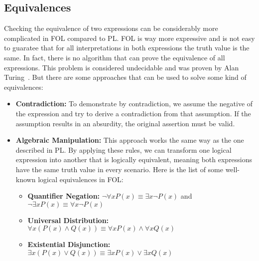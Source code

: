 \subsection{Equivalences}
Checking the equivalence of two expressions can be considerably more complicated in \gls{FOL} compared to \gls{PL}. \gls{FOL} is way more expressive and is not easy to guaratee that for all interpretations in both expressions the truth value is the same. In fact, there is no algorithm that can prove the equivalence of all expressions. This problem is considered undecidable and was proven by Alan Turing~\cite{turing_1936_on}. But there are some approaches that can be used to solve some kind of equivalences:

\begin{itemize}
    \item \textbf{Contradiction:} To demonstrate by contradiction, we assume the negative of the expression and try to derive a contradiction from that assumption. If the assumption results in an absurdity, the original assertion must be valid.
    \item \textbf{Algebraic Manipulation:} This approach works the same way as the one described in \gls{PL}. By applying these rules, we can transform one logical expression into another that is logically equivalent, meaning both expressions have the same truth value in every scenario. Here is the list of some well-known logical equivalences in \gls{FOL}:

    \begin{itemize}
        \item \textbf{Quantifier Negation:} \( \neg \forall x P(x) \equiv \exists x \neg P(x) \) and \( \neg \exists x P(x) \equiv \forall x \neg P(x) \)
        \item \textbf{Universal Distribution:} \( \forall x (P(x) \land Q(x)) \equiv \forall x P(x) \land \forall x Q(x) \)
        \item \textbf{Existential Disjunction:} \( \exists x (P(x) \lor Q(x)) \equiv \exists x P(x) \lor \exists x Q(x) \)

    \end{itemize}

\end{itemize}  

